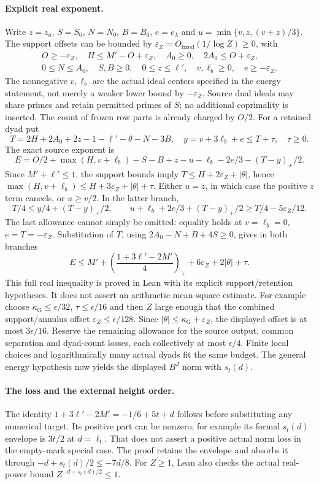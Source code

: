 \paragraph{Explicit real exponent.}
Write $z=z_a$, $S=S_0$, $N=N_0$, $B=B_0$, $e=e_\lambda$ and
$u=\min\{v,z,(v+z)/3\}$. The support offsets can be bounded by
$\varepsilon_Z=O_{\mathrm{fixed}}(1/\log Z)\ge0$, with
\[
 \begin{gathered}
 O\ge-\varepsilon_Z,\quad H\le M'-O+\varepsilon_Z,\quad
 A_0\ge0,\quad2A_0\le O+\varepsilon_Z,\\
 0\le N\le A_0,\quad S,B\ge0,\quad0\le z\le\ell',\quad
 v,\ell_b\ge0,\quad e\ge-\varepsilon_Z.
 \end{gathered}
\]
The nonnegative $v,\ell_b$ are the actual ideal centers specified in the
energy statement, not merely a weaker lower bound by
$-\varepsilon_Z$. Source dual ideals may share primes and retain
permitted primes of $S$; no additional coprimality is inserted.
The count of frozen row parts is already charged by $O/2$.
For a retained dyad put
\[
 T=2H+2A_0+2z-1-\ell'-\theta-N-3B,\quad
 y=v+3\ell_b+e\le T+\tau,\quad\tau\ge0.
\]
The exact source exponent is
\[
 E=O/2+\max(H,v+\ell_b)-S-B+z-u-\ell_b-2e/3-(T-y)_+/2.
\]
Since $M'+\ell'\le1$, the support bounds imply
$T\le H+2\varepsilon_Z+|\theta|$, hence
$\max(H,v+\ell_b)\le H+3\varepsilon_Z+|\theta|+\tau$.
Either $u=z$, in which case the positive $z$ term cancels, or
$u\ge v/2$. In the latter branch,
\[
 T/4\le y/4+(T-y)_+/2,\qquad
 u+\ell_b+2e/3+(T-y)_+/2\ge T/4-5\varepsilon_Z/12.
\]
The last allowance cannot simply be omitted: equality holds at
$v=\ell_b=0$, $e=T=-\varepsilon_Z$.
Substitution of $T$, using $2A_0-N+B+4S\ge0$, gives in both branches
\[
 E\le M'+\left(\frac{1+3\ell'-2M'}4\right)_+
          +6\varepsilon_Z+2|\theta|+\tau.
\]
This full real inequality is proved in Lean with its explicit
support/retention hypotheses. It does not assert an arithmetic
mean-square estimate. For example choose $\kappa_{\mathrm G}\le\epsilon/32$,
$\tau\le\epsilon/16$ and then $Z$ large enough that the combined
support/annulus offset $\varepsilon_Z\le\epsilon/128$. Since
$|\theta|\le\kappa_{\mathrm G}+\varepsilon_Z$, the displayed
offset is at most $3\epsilon/16$. Reserve the remaining allowance
for the source output, common separation and dyad-count losses,
each collectively at most $\epsilon/4$.
Finite local choices and logarithmically many actual dyads fit the
same budget. The general energy hypothesis now yields the displayed
$B^J$ norm with $s_t(d)$.

\paragraph{The loss and the external height order.}
The identity
$1+3\ell'-2M'=-1/6+5t+d$ follows before substituting any numerical
target. Its positive part can be nonzero; for example its formal
$s_t(d)$ envelope is $3t/2$ at $d=\ell_t$. That does not assert a
positive actual norm loss in the empty-mark special case. The proof
retains the envelope and absorbs it through
$-d+s_t(d)/2\le-7d/8$. For $Z\ge1$, Lean also checks the actual
real-power bound $Z^{-d+s_t(d)/2}\le1$.

